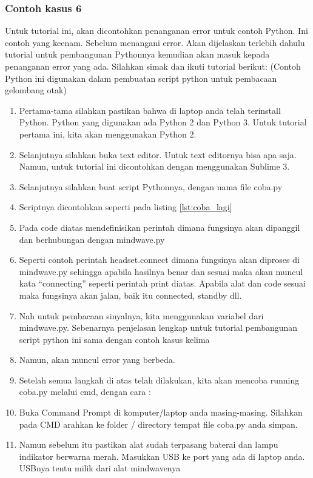 \subsubsection{Contoh kasus 6}
Untuk tutorial ini, akan dicontohkan penanganan error untuk contoh Python. Ini contoh yang keenam. Sebelum menangani error. Akan dijelaskan terlebih dahulu tutorial untuk pembangunan Pythonnya kemudian akan masuk kepada penanganan error yang ada. Silahkan simak dan ikuti tutorial berikut: 
(Contoh Python ini digunakan dalam pembuatan script python untuk pembacaan gelombang otak)
\begin{enumerate}
\item Pertama-tama silahkan pastikan bahwa di laptop anda telah terinstall Python. Python yang digunakan ada Python 2 dan Python 3. Untuk tutorial pertama ini, kita akan menggunakan Python 2.
\item Selanjutnya silahkan buka text editor. Untuk text editornya bisa apa saja. Namun, untuk tutorial ini dicontohkan dengan menggunakan Sublime 3.
\item Selanjutnya silahkan buat script Pythonnya, dengan nama file coba.py
\item Scriptnya dicontohkan seperti pada listing \ref{lst:coba_lagi}

\item Pada code diatas mendefinisikan perintah dimana fungsinya akan dipanggil dan berhubungan dengan mindwave.py
\item Seperti contoh perintah headset.connect dimana fungsinya akan diproses di mindwave.py sehingga apabila hasilnya benar dan sesuai maka akan muncul kata “connecting” seperti perintah print diatas. Apabila alat dan code sesuai maka fungsinya akan jalan, baik itu connected, standby dll. 
\item Nah untuk pembacaan sinyalnya, kita menggunakan variabel dari mindwave.py. Sebenarnya penjelasan lengkap untuk tutorial pembangunan script python ini sama dengan contoh kasus kelima
\item Namun, akan muncul error yang berbeda.
\item Setelah semua langkah di atas telah dilakukan, kita akan mencoba running coba.py melalui cmd, dengan cara :
\item Buka Command Prompt di komputer/laptop anda masing-masing. Silahkan pada CMD arahkan ke folder / directory tempat file coba.py anda simpan.
\item Namun sebelum itu pastikan alat sudah terpasang baterai dan lampu indikator berwarna merah. Masukkan USB ke port yang ada di laptop anda. USBnya tentu milik dari alat mindwavenya

\end{enumerate}
